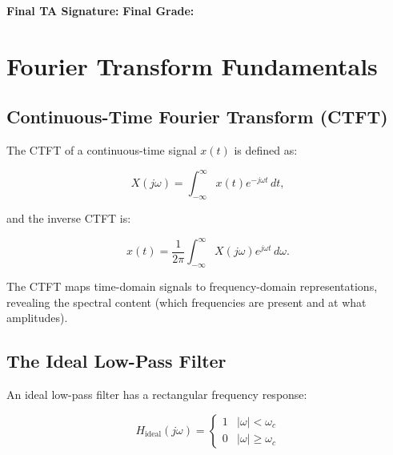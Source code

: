 \documentclass[11pt,letterpaper]{article}
\begin{document}
\vspace{0.5cm}

\textbf{Final TA Signature:} \underline{\hspace{4cm}} \quad \textbf{Final Grade:} \underline{\hspace{1.5cm}}

\clearpage

\appendix

\section{Fourier Transform Fundamentals}

\subsection{Continuous-Time Fourier Transform (CTFT)}

The CTFT of a continuous-time signal $x(t)$ is defined as:

\begin{equation}
X(j\omega) = \int_{-\infty}^{\infty} x(t) e^{-j\omega t} \, dt,
\end{equation}

\noindent
and the inverse CTFT is:

\begin{equation}
x(t) = \frac{1}{2\pi} \int_{-\infty}^{\infty} X(j\omega) e^{j\omega t} \, d\omega.
\end{equation}

\noindent
The CTFT maps time-domain signals to frequency-domain representations, revealing the spectral content (which frequencies are present and at what amplitudes).

\subsection{The Ideal Low-Pass Filter}

An ideal low-pass filter has a rectangular frequency response:

\begin{equation}
H_{\text{ideal}}(j\omega) = \begin{cases}
1 & |\omega| < \omega_c \\
0 & |\omega| \ge \omega_c
\end{cases}
\end{equation}
\end{document}
